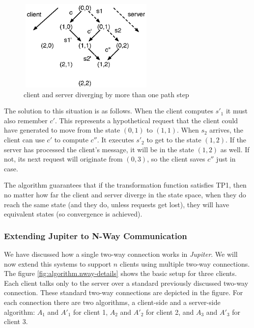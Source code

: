 \begin{figure}[htb]
 \centering
 \includegraphics[width=6.71cm,height=4.5cm]{../images/finalreport/algorithm_statespace2.eps}
 \caption{client and server diverging by more than one path step}
 \label{fig:algorithm.statespace2}
\end{figure}

The solution to this situation is as follows. When the client computes $s'_1$ it 
must also remember $c'$. This represents a hypothetical request that the client 
could have generated to move from the state $(0,1)$ to $(1,1)$. When $s_2$
arrives, the client can use $c'$ to compute $c''$. It executes $s'_2$ to get to 
the state $(1,2)$. If the server has processed the client's message, it will be 
in the state $(1,2)$ as well. If not, its next request will originate from 
$(0,3)$, so the client saves $c''$ just in case.

The algorithm guarantees that if the transformation function satisfies TP1, then 
no matter how far the client and server diverge in the state space, when they do 
reach the same state (and they do, unless requests get lost), they will have 
equivalent states (so convergence is achieved).

\subsubsection{Extending Jupiter to N-Way Communication}
\label{sect:algorithm.jupiter.nway}
We have discussed how a single two-way connection works in \emph{Jupiter}. We will now extend this systems to support $n$ clients using multiple two-way connections. The figure \ref{fig:algorithm.nway-details} shows the basic setup for three clients. Each client talks only to the server over a standard previously discussed two-way connection. These standard two-way connections
are depicted in the figure. For each connection there are two algorithms,
a client-side and a server-side algorithm:
$A_1$ and $A'_1$ for client 1, $A_2$ and $A'_2$ for client 2, and $A_3$ and
$A'_3$ for client 3. 

